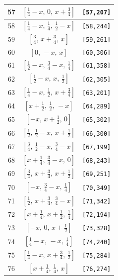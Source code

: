 \documentclass[fleqn,8pt]{jsarticle}
\begin{document}
\begin{longtable}{ccc}
57 & $\left[ \frac{1}{4} - x,\, 0,\, x + \frac{3}{4} \right]$ & {\tt [57,207]} \\ \hline
58 & $\left[ \frac{1}{4} - x,\, \frac{1}{4},\, \frac{1}{2} - x \right]$ & {\tt [58,244]} \\ \hline
59 & $\left[ \frac{3}{4},\, x + \frac{3}{4},\, x \right]$ & {\tt [59,261]} \\ \hline
60 & $\left[ 0,\, - x,\, x \right]$ & {\tt [60,306]} \\ \hline
61 & $\left[ \frac{1}{2} - x,\, \frac{3}{4} - x,\, \frac{1}{4} \right]$ & {\tt [61,358]} \\ \hline
62 & $\left[ \frac{1}{2} - x,\, x,\, \frac{1}{2} \right]$ & {\tt [62,305]} \\ \hline
63 & $\left[ \frac{1}{4} - x,\, \frac{1}{2},\, x + \frac{3}{4} \right]$ & {\tt [63,201]} \\ \hline
64 & $\left[ x + \frac{1}{2},\, \frac{1}{2},\, - x \right]$ & {\tt [64,289]} \\ \hline
65 & $\left[ - x,\, x + \frac{1}{2},\, 0 \right]$ & {\tt [65,302]} \\ \hline
66 & $\left[ \frac{1}{2},\, \frac{1}{2} - x,\, x + \frac{1}{2} \right]$ & {\tt [66,300]} \\ \hline
67 & $\left[ \frac{3}{4},\, \frac{1}{2} - x,\, \frac{3}{4} - x \right]$ & {\tt [67,199]} \\ \hline
68 & $\left[ x + \frac{1}{4},\, \frac{3}{4} - x,\, 0 \right]$ & {\tt [68,243]} \\ \hline
69 & $\left[ \frac{3}{4},\, x + \frac{3}{4},\, x + \frac{1}{2} \right]$ & {\tt [69,251]} \\ \hline
70 & $\left[ - x,\, \frac{3}{4} - x,\, \frac{1}{4} \right]$ & {\tt [70,349]} \\ \hline
71 & $\left[ \frac{1}{2},\, x + \frac{3}{4},\, \frac{3}{4} - x \right]$ & {\tt [71,342]} \\ \hline
72 & $\left[ x + \frac{1}{4},\, x + \frac{1}{2},\, \frac{1}{4} \right]$ & {\tt [72,194]} \\ \hline
73 & $\left[ - x,\, 0,\, x + \frac{1}{2} \right]$ & {\tt [73,328]} \\ \hline
74 & $\left[ \frac{1}{4} - x,\, - x,\, \frac{1}{4} \right]$ & {\tt [74,240]} \\ \hline
75 & $\left[ \frac{1}{4} - x,\, x + \frac{3}{4},\, \frac{1}{2} \right]$ & {\tt [75,284]} \\ \hline
76 & $\left[ x + \frac{1}{4},\, \frac{1}{4},\, x \right]$ & {\tt [76,274]} \\ \hline

\end{longtable}
\end{document}
